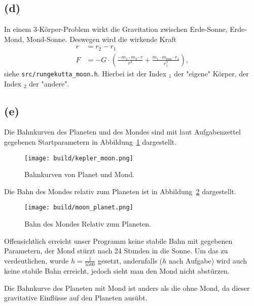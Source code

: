 \documentclass{scrartcl}
\begin{document}
\subsection*{(d)}
In einem 3-Körper-Problem wirkt die Gravitation zwischen Erde-Sonne, Erde-Mond, Mond-Sonne.
Deswegen wird die wirkende Kraft
\begin{align}
  r &= r_2 - r_1 \\
  F &= - G \cdot \left(\frac{- m_1 \cdot m_2 \cdot r}{r^3} + \frac{m_1 \cdot m_{\text{sun}} \cdot
    r_1}{r_1^3}\right)\text{,}
\end{align}
siehe \texttt{src/rungekutta\_moon.h}.
Hierbei ist der Index ${}_1$ der "eigene" Körper,
der Index ${}_2$ der "andere".
\subsection*{(e)}
Die Bahnkurven des Planeten und des Mondes sind mit laut Aufgabenzettel gegebenen Startparametern
in Abbildung~\ref{fig:kepler_moon} dargestellt.
\begin{figure}[ht]
  \centering
  \texttt{[image: build/kepler\_moon.png]}
  \caption{Bahnkurven von Planet und Mond.}%
  \label{fig:kepler_moon}
\end{figure}

Die Bahn des Mondes relativ zum Planeten ist in Abbildung~\ref{fig:moon_planet} dargestellt.
\begin{figure}[ht]
  \centering
  \texttt{[image: build/moon\_planet.png]}
  \caption{Bahn des Mondes Relativ zum Planeten.}%
  \label{fig:moon_planet}
\end{figure}

Offensichtlich erreicht unser Programm keine stabile Bahn mit gegebenen Parametern, der Mond
stürzt nach 24 Stunden in die Sonne.
Um das zu verdeutlichen, wurde $h = \frac{1}{5500}$ gesetzt, andernfalls ($h$ nach Aufgabe) wird
auch keine stabile Bahn erreicht, jedoch sieht man den Mond nicht abstürzen.

Die Bahnkurve des Planeten mit Mond ist anders als die ohne Mond, da dieser gravitative Einflüsse auf den
Planeten ausübt.
\end{document}
